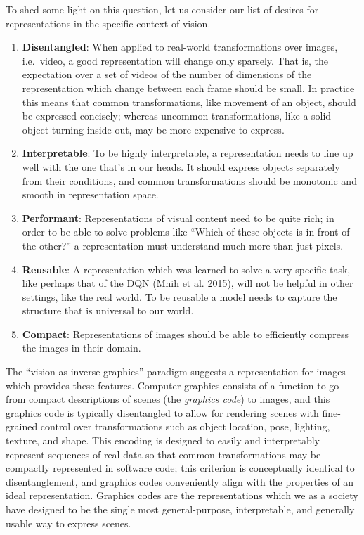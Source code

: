 \documentclass[12pt,twoside]{mitthesis}
\begin{document}
To shed some light on this question, let us consider our list of desires
for representations in the specific context of vision.

\begin{enumerate}
\def\labelenumi{\arabic{enumi}.}
\item
  \textbf{Disentangled}: When applied to real-world transformations over
  images, i.e.~video, a good representation will change only sparsely.
  That is, the expectation over a set of videos of the number of
  dimensions of the representation which change between each frame
  should be small. In practice this means that common transformations,
  like movement of an object, should be expressed concisely; whereas
  uncommon transformations, like a solid object turning inside out, may
  be more expensive to express.
\item
  \textbf{Interpretable}: To be highly interpretable, a representation
  needs to line up well with the one that's in our heads. It should
  express objects separately from their conditions, and common
  transformations should be monotonic and smooth in representation
  space.
\item
  \textbf{Performant}: Representations of visual content need to be
  quite rich; in order to be able to solve problems like ``Which of
  these objects is in front of the other?'' a representation must
  understand much more than just pixels.
\item
  \textbf{Reusable}: A representation which was learned to solve a very
  specific task, like perhaps that of the DQN (Mnih et al.
  \protect\hyperlink{ref-mnih2015human}{2015}), will not be helpful in
  other settings, like the real world. To be reusable a model needs to
  capture the structure that is universal to our world.
\item
  \textbf{Compact}: Representations of images should be able to
  efficiently compress the images in their domain.
\end{enumerate}

The ``vision as inverse graphics'' paradigm suggests a representation
for images which provides these features. Computer graphics consists of
a function to go from compact descriptions of scenes (the \emph{graphics
code}) to images, and this graphics code is typically disentangled to
allow for rendering scenes with fine-grained control over
transformations such as object location, pose, lighting, texture, and
shape. This encoding is designed to easily and interpretably represent
sequences of real data so that common transformations may be compactly
represented in software code; this criterion is conceptually identical
to disentanglement, and graphics codes conveniently align with the
properties of an ideal representation. Graphics codes are the
representations which we as a society have designed to be the single
most general-purpose, interpretable, and generally usable way to express
scenes.
\end{document}
